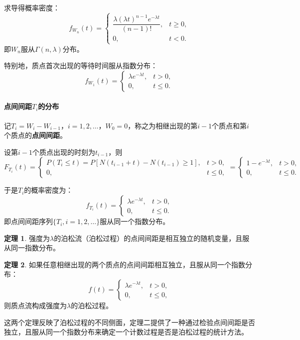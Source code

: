 \documentclass[11pt,a4paper]{report}
\theoremstyle{definition}
\newtheorem{theorem}{定理}[chapter]
\begin{document}
求导得概率密度：
\[
f_{W_n}(t)=
\begin{cases}
\dfrac{\lambda(\lambda t)^{n-1}e^{-\lambda t}}{(n-1)!}, & t\geq0,\\[1em]
0, & t<0.
\end{cases}
\]
即$W_n$服从$\Gamma(n,\lambda)$分布。

特别地，质点首次出现的等待时间服从指数分布：
\[
f_{W_1}(t)=
\begin{cases}
\lambda e^{-\lambda t}, & t>0,\\
0, & t\leq0.
\end{cases}
\]

\paragraph{点间间距$T_i$的分布}

记$T_i=W_i-W_{i-1}$，$i=1,2,\ldots$，$W_0=0$，称之为相继出现的第$i-1$个质点和第$i$个质点的\textbf{点间间距}。

设第$i-1$个质点出现的时刻为$t_{i-1}$，则
\[
F_{T_i}(t)=
\begin{cases}
P(T_i\leq t)=P[N(t_{i-1}+t)-N(t_{i-1})\geq1], & t>0,\\
0, & t\leq0,
\end{cases}
=
\begin{cases}
1-e^{-\lambda t}, & t>0,\\
0, & t\leq0.
\end{cases}
\]

于是$T_i$的概率密度为：
\[
f_{T_i}(t)=
\begin{cases}
\lambda e^{-\lambda t}, & t>0,\\
0, & t\leq0.
\end{cases}
\]
即点间间距序列$\{T_i,i=1,2,\ldots\}$服从同一个指数分布。

\begin{theorem}
强度为$\lambda$的泊松流（泊松过程）的点间间距是相互独立的随机变量，且服从同一指数分布。
\end{theorem}

\begin{theorem}
如果任意相继出现的两个质点的点间间距相互独立，且服从同一个指数分布：
\[
f(t)=
\begin{cases}
\lambda e^{-\lambda t}, & t>0,\\
0, & t\leq0,
\end{cases}
\]
则质点流构成强度为$\lambda$的泊松过程。
\end{theorem}

这两个定理反映了泊松过程的不同侧面，定理二提供了一种通过检验点间间距是否独立，且服从同一个指数分布来确定一个计数过程是否是泊松过程的统计方法。
\end{document}
